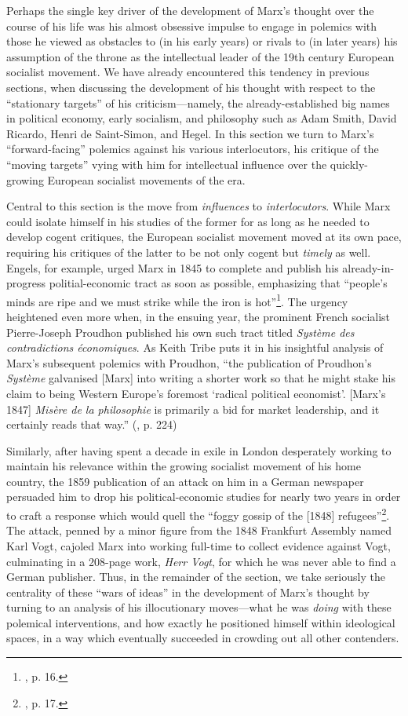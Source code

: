 Perhaps the single key driver of the development of Marx's thought over the course of his life was his almost obsessive impulse to engage in polemics with those he viewed as obstacles to (in his early years) or rivals to (in later years) his assumption of the throne as the intellectual leader of the 19th century European socialist movement. We have already encountered this tendency in previous sections, when discussing the development of his thought with respect to the ``stationary targets'' of his criticism---namely, the already-established big names in political economy, early socialism, and philosophy such as Adam Smith, David Ricardo, Henri de Saint-Simon, and Hegel. In this section we turn to Marx's ``forward-facing'' polemics against his various interlocutors, his critique of the ``moving targets'' vying with him for intellectual influence over the quickly-growing European socialist movements of the era.

Central to this section is the move from \textit{influences} to \textit{interlocutors}. While Marx could isolate himself in his studies of the former for as long as he needed to develop cogent critiques, the European socialist movement moved at its own pace, requiring his critiques of the latter to be not only cogent but \textit{timely} as well. Engels, for example, urged Marx in 1845 to complete and publish his already-in-progress politial-economic tract as soon as possible, emphasizing that ``people's minds are ripe and we must strike while the iron is hot''\footnote{, p. 16.}. The urgency heightened even more when, in the ensuing year, the prominent French socialist Pierre-Joseph Proudhon published his own such tract titled \textit{Système des contradictions économiques}. As Keith Tribe puts it in his insightful analysis of Marx's subsequent polemics with Proudhon, ``the publication of Proudhon’s \textit{Système} galvanised [Marx] into writing a shorter work so that he might stake his claim to being Western Europe's foremost `radical political economist'. [Marx's 1847] \textit{Misère de la philosophie} is primarily a bid for market leadership, and it certainly reads that way.'' (\cite{tribe_economy_2015}, p. 224) 

Similarly, after having spent a decade in exile in London desperately working to maintain his relevance within the growing socialist movement of his home country, the 1859 publication of an attack on him in a German newspaper persuaded him to drop his political-economic studies for nearly two years in order to craft a response which would quell the ``foggy gossip of the [1848] refugees''\footnote{, p. 17.}. The attack, penned by a minor figure from the 1848 Frankfurt Assembly named Karl Vogt, cajoled Marx into working full-time to collect evidence against Vogt, culminating in a 208-page work, \textit{Herr Vogt}, for which he was never able to find a German publisher. Thus, in the remainder of the section, we take seriously the centrality of these ``wars of ideas'' in the development of Marx's thought by turning to an analysis of his illocutionary moves---what he was \textit{doing} with these polemical interventions, and how exactly he positioned himself within ideological spaces, in a way which eventually succeeded in crowding out all other contenders.

